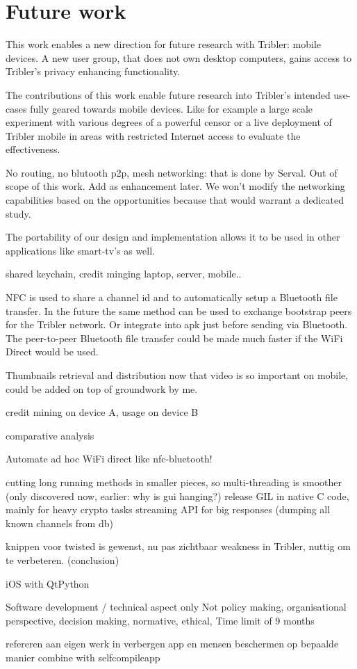 \section{Future work}
\label{ch:future_work}

This work enables a new direction for future research with Tribler: mobile devices.
A new user group, that does not own desktop computers, gains access to Tribler's privacy enhancing functionality.

The contributions of this work enable future research into Tribler's intended use-cases fully geared towards mobile devices.
Like for example a large scale experiment with various degrees of a powerful censor or a live deployment of Tribler mobile in areas with restricted Internet access to evaluate the effectiveness.



No routing, no blutooth p2p, mesh networking: that is done by Serval. Out of scope of this work. Add as enhancement later.
We won't modify the networking capabilities based on the opportunities because that would warrant a dedicated study.


The portability of our design and implementation allows it to be used in other applications like smart-tv's as well.



shared keychain, credit minging laptop, server, mobile..


NFC is used to share a channel id and to automatically setup a Bluetooth file transfer.
In the future the same method can be used to exchange bootstrap peers for the Tribler network. Or integrate into apk just before sending via Bluetooth.
The peer-to-peer Bluetooth file transfer could be made much faster if the WiFi Direct would be used.


Thumbnails retrieval and distribution now that video is so important on mobile, could be added on top of groundwork by me.


credit mining on device A, usage on device B


comparative analysis

Automate ad hoc WiFi direct like nfc-bluetooth!

cutting long running methods in smaller pieces, so multi-threading is smoother (only discovered now, earlier: why is gui hanging?)
release GIL in native C code, mainly for heavy crypto tasks
streaming API for big responses (dumping all known channels from db)

knippen voor twisted is gewenst, nu pas zichtbaar weakness in Tribler, nuttig om te verbeteren. (conclusion)


iOS with QtPython


Software development / technical aspect only
Not policy making, organisational perspective, decision making, normative, ethical,
Time limit of 9 months


refereren aan eigen werk in verbergen app en mensen beschermen op bepaalde manier
combine with selfcompileapp
